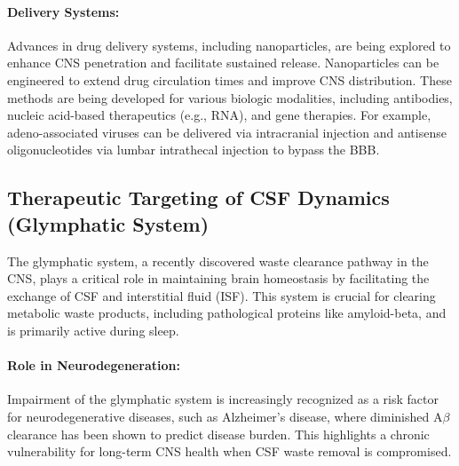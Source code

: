 	\paragraph{Delivery Systems:} Advances in drug delivery systems, including nanoparticles, are being explored to enhance CNS penetration and facilitate sustained release. Nanoparticles can be engineered to extend drug circulation times and improve CNS distribution. These methods are being developed for various biologic modalities, including antibodies, nucleic acid-based therapeutics (e.g., RNA), and gene therapies. For example, adeno-associated viruses can be delivered via intracranial injection and antisense oligonucleotides via lumbar intrathecal injection to bypass the BBB.
	
	\subsection*{Therapeutic Targeting of CSF Dynamics (Glymphatic System)}
	
	The glymphatic system, a recently discovered waste clearance pathway in the CNS, plays a critical role in maintaining brain homeostasis by facilitating the exchange of CSF and interstitial fluid (ISF). This system is crucial for clearing metabolic waste products, including pathological proteins like amyloid-beta, and is primarily active during sleep.
	
	\paragraph{Role in Neurodegeneration:} Impairment of the glymphatic system is increasingly recognized as a risk factor for neurodegenerative diseases, such as Alzheimer's disease, where diminished A$\beta$ clearance has been shown to predict disease burden. This highlights a chronic vulnerability for long-term CNS health when CSF waste removal is compromised.
	
